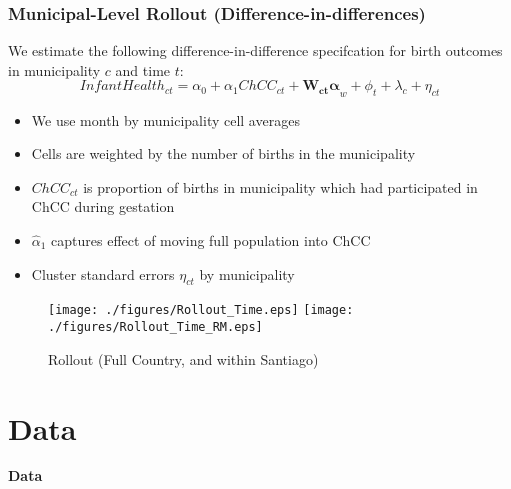 \documentclass[10pt,letterpaper,subeqn,table]{beamer}
\begin{document}
\begin{frame}
\frametitle{Municipal-Level Rollout (Difference-in-differences)}
We estimate the following difference-in-difference specifcation for birth outcomes in municipality $c$ and time $t$:  \vspace{3mm}
\begin{equation}
  \label{eqn:DD}
  Infant Health_{ct} = \alpha_0 + \alpha_1 ChCC_{ct} + \bm{W_{ct}\alpha}_{w} + \phi_t + \lambda_c + \eta_{ct}
\end{equation}
\vspace{3mm}
\begin{itemize}
\item We use month by municipality cell averages
\item Cells are weighted by the number of births in the municipality
\item $ChCC_{ct}$ is proportion of births in municipality which had participated in ChCC during gestation
\item $\widehat\alpha_1$ captures effect of moving full population into ChCC
\item Cluster standard errors $\eta_{ct}$ by municipality
\end{itemize}
\end{frame}

\begin{frame}
\begin{figure}[htpb!]
  \begin{center}
  \centering
  \caption{Rollout (Full Country, and within Santiago)}
  \texttt{[image: ./figures/Rollout\_Time.eps]}
  \hspace{1cm}
  \texttt{[image: ./figures/Rollout\_Time\_RM.eps]}
  \label{fig:ChCCcover}
\end{center}
\end{figure}
\end{frame}

\section{Data}
\begin{frame}
\begin{center}
  \textbf{Data}
\end{center}
\end{frame}
\end{document}
